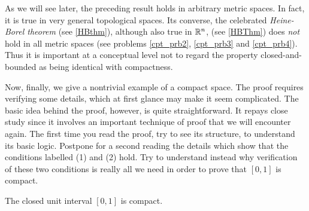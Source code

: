 As we will see later, the preceding result holds in arbitrary metric spaces.  In fact, it is
true in very general topological spaces.  Its converse, the celebrated \emph{Heine-Borel
theorem} (see \ref{HBthm}), although also true in $\mathbb{R}^n$, (see \ref{HBThm}) does \emph{not}
hold in all metric spaces (see problems \ref{cpt_prb2}, \ref{cpt_prb3} and \ref{cpt_prb4}).
Thus it is important at a conceptual level not to regard the property closed-and-bounded as
being identical with compactness.

Now, finally, we give a nontrivial example of a compact space.  The proof requires verifying
some details, which at first glance may make it seem complicated.  The basic idea behind the
proof, however, is quite straightforward.  It repays close study since it involves an
important technique of proof that we will encounter again.  The first time you read the proof,
try to see its structure, to understand its basic logic.  Postpone for a second reading the
details which show that the conditions labelled (1) and (2) hold.  Try to understand instead
why verification of these two conditions is really all we need in order to prove that $[0,1]$
is compact.

\begin{exam}\label{cpt_exm2} The closed unit interval $[0,1]$ is compact.
\end{exam}

